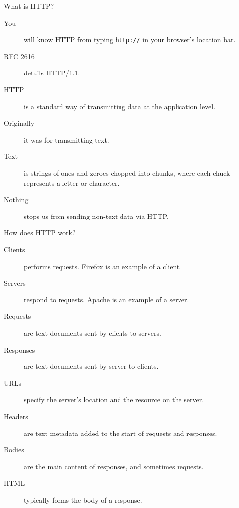\begin{frame}{What is HTTP?}
  \begin{description}
		\item[You] will know HTTP from typing \texttt{http://} in your browser's location bar.
    \item[RFC 2616] details HTTP/1.1.
    \item[HTTP] is a standard way of transmitting data at the application level.
    \item[Originally] it was for transmitting text.
    \item[Text] is strings of ones and zeroes chopped into chunks, where each chuck represents a letter or character.
    \item[Nothing] stops us from sending non-text data via HTTP. 
  \end{description}
\end{frame}


\begin{frame}{How does HTTP work?}
  \begin{description}
		\item[Clients] performs requests. Firefox is an example of a client.
    \item[Servers] respond to requests. Apache is an example of a server.
    \item[Requests] are text documents sent by clients to servers.
    \item[Responses] are text documents sent by server to clients.
    \item[URLs] specify the server's location and the resource on the server.
    \item[Headers] are text metadata added to the start of requests and responses.
    \item[Bodies] are the main content of responses, and sometimes requests.
    \item[HTML] typically forms the body of a response.  
  \end{description}
\end{frame}



